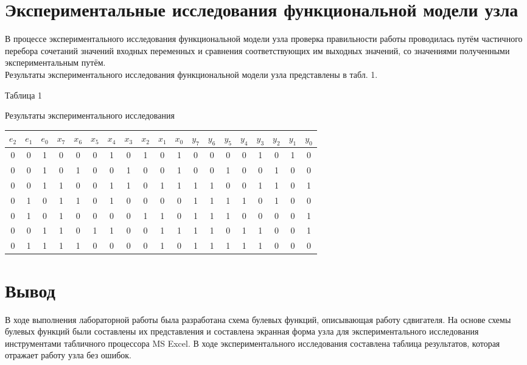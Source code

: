 \documentclass[oneside,a4paper,14pt]{extarticle}
\begin{document}
\section*{Экспериментальные исследования функциональной модели узла}
В процессе экспериментального исследования функциональной модели узла проверка правильности работы проводилась путём частичного перебора сочетаний значений входных переменных и сравнения соответствующих им выходных значений, со значениями полученными экспериментальным путём.\\
Результаты экспериментального исследования функциональной модели узла представлены в табл. 1.\\
\begin{flushright}
    Таблица 1
\end{flushright}
\begin{center}
Результаты экспериментального исследования\\
\end{center}
\begin{small}

\begin{tabular}{|c|c|c|c|c|c|c|c|c|c|c|c|c|c|c|c|c|c|c|}
\hline
{$e_2$} & {$e_1$} & {$e_0$} &
{$x_7$} & {$x_6$} & {$x_5$} &
{$x_4$} & {$x_3$} & {$x_2$} &
{$x_1$} & {$x_0$} &
{$y_7$} & {$y_6$} & {$y_5$} &
{$y_4$} & {$y_3$} & {$y_2$} &
{$y_1$} & {$y_0$} \\
\hline
0 & 0 & 1 & 0 & 0 & 0 & 1 & 0 & 1 & 0 & 1 & 0 & 0 & 0 & 0 & 1 & 0 & 1 & 0 \\
\hline
0 & 0 & 1 & 0 & 1 & 0 & 0 & 1 & 0 & 0 & 1 & 0 & 0 & 1 & 0 & 0 & 1 & 0 & 0 \\
\hline
0 & 0 & 1 & 1 & 0 & 0 & 1 & 1 & 0 & 1 & 1 & 1 & 1 & 0 & 0 & 1 & 1 & 0 & 1 \\
\hline
0 & 1 & 0 & 1 & 1 & 0 & 1 & 0 & 0 & 0 & 0 & 1 & 1 & 1 & 1 & 0 & 1 & 0 & 0 \\
\hline
0 & 1 & 0 & 1 & 0 & 0 & 0 & 0 & 1 & 1 & 0 & 1 & 1 & 1 & 0 & 0 & 0 & 0 & 1 \\
\hline
0 & 0 & 1 & 1 & 0 & 1 & 1 & 0 & 0 & 1 & 1 & 1 & 1 & 0 & 1 & 1 & 0 & 0 & 1 \\
\hline
0 & 1 & 1 & 1 & 1 & 0 & 0 & 0 & 0 & 1 & 0 & 1 & 1 & 1 & 1 & 1 & 0 & 0 & 0 \\
\hline
\end{tabular}

\end{small}

\section*{Вывод}
В ходе выполнения лабораторной работы была разработана схема булевых функций, описывающая работу сдвигателя. На основе схемы булевых функций были составлены их представления и составлена экранная форма узла для экспериментального исследования инструментами табличного процессора MS Excel. В ходе экспериментального исследования составлена таблица результатов, которая отражает работу узла без ошибок.
\end{document}
